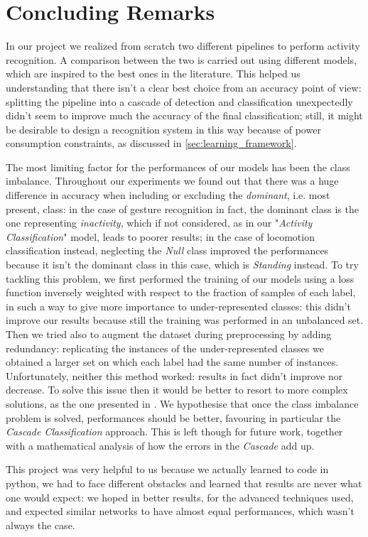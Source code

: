 
\section{Concluding Remarks}
\label{sec:conclusions}

In our project we realized from scratch two different pipelines to perform activity recognition. A comparison between the two is carried out using different models, which are inspired to the best ones in the literature. This helped us understanding that there isn't a clear best choice from an accuracy point of view: splitting the pipeline into a cascade of detection and classification unexpectedly didn't seem to improve much the accuracy of the final classification; still, it might be desirable to design a recognition system in this way because of power consumption constraints, as discussed in \ref{sec:learning_framework}.

The most limiting factor for the performances of our models has been the class imbalance. Throughout our experiments we found out that there was a huge difference in accuracy when including or excluding the \textit{dominant}, i.e. most present, class: in the case of gesture recognition in fact, the dominant class is the one representing \textit{inactivity}, which if not considered, as in our "\textit{Activity Classification}" model, leads to poorer results; in the case of locomotion classification instead, neglecting the \textit{Null} class improved the performances because it isn't the dominant class in this case, which is \textit{Standing} instead.
To try tackling this problem, we first performed the training of our models using a loss function inversely weighted with respect to the fraction of samples of each label, in such a way to give more importance to under-represented classes: this didn't improve our results because still the training was performed in an unbalanced set. Then we tried also to augment the dataset during preprocessing by adding redundancy: replicating the instances of the under-represented classes we obtained a larger set on which each label had the same number of instances. Unfortunately, neither this method worked: results in fact didn't improve nor decrease. To solve this issue then it would be better to resort to more complex solutions, as the one presented in \cite{cao2012integrated}.
We hypothesise that once the class imbalance problem is solved, performances should be better, favouring in particular the \textit{Cascade Classification} approach. This is left though for future work, together with a mathematical analysis of how the errors in the \textit{Cascade} add up.

This project was very helpful to us because we actually learned to code in python, we had to face different obstacles and learned that results are never what one would expect: we hoped in better results, for the advanced techniques used, and expected similar networks to have almost equal performances, which wasn't always the case.